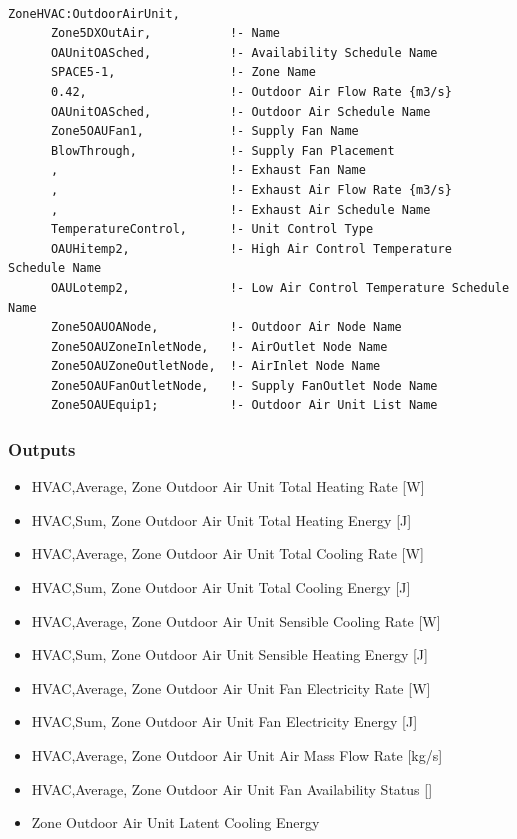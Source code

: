 \begin{lstlisting}

ZoneHVAC:OutdoorAirUnit,
      Zone5DXOutAir,           !- Name
      OAUnitOASched,           !- Availability Schedule Name
      SPACE5-1,                !- Zone Name
      0.42,                    !- Outdoor Air Flow Rate {m3/s}
      OAUnitOASched,           !- Outdoor Air Schedule Name
      Zone5OAUFan1,            !- Supply Fan Name
      BlowThrough,             !- Supply Fan Placement
      ,                        !- Exhaust Fan Name
      ,                        !- Exhaust Air Flow Rate {m3/s}
      ,                        !- Exhaust Air Schedule Name
      TemperatureControl,      !- Unit Control Type
      OAUHitemp2,              !- High Air Control Temperature Schedule Name
      OAULotemp2,              !- Low Air Control Temperature Schedule Name
      Zone5OAUOANode,          !- Outdoor Air Node Name
      Zone5OAUZoneInletNode,   !- AirOutlet Node Name
      Zone5OAUZoneOutletNode,  !- AirInlet Node Name
      Zone5OAUFanOutletNode,   !- Supply FanOutlet Node Name
      Zone5OAUEquip1;          !- Outdoor Air Unit List Name
\end{lstlisting}

\subsubsection{Outputs}\label{outputs-5-012}

\begin{itemize}
\item
  HVAC,Average, Zone Outdoor Air Unit Total Heating Rate {[}W{]}
\item
  HVAC,Sum, Zone Outdoor Air Unit Total Heating Energy {[}J{]}
\item
  HVAC,Average, Zone Outdoor Air Unit Total Cooling Rate {[}W{]}
\item
  HVAC,Sum, Zone Outdoor Air Unit Total Cooling Energy {[}J{]}
\item
  HVAC,Average, Zone Outdoor Air Unit Sensible Cooling Rate {[}W{]}
\item
  HVAC,Sum, Zone Outdoor Air Unit Sensible Heating Energy {[}J{]}
\item
  HVAC,Average, Zone Outdoor Air Unit Fan Electricity Rate {[}W{]}
\item
  HVAC,Sum, Zone Outdoor Air Unit Fan Electricity Energy {[}J{]}
\item
  HVAC,Average, Zone Outdoor Air Unit Air Mass Flow Rate {[}kg/s{]}
\item
  HVAC,Average, Zone Outdoor Air Unit Fan Availability Status {[]}
\item
  Zone Outdoor Air Unit Latent Cooling Energy
\end{itemize}

